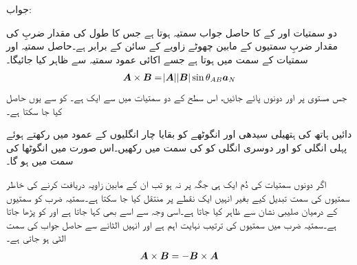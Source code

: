 جواب:

دو سمتیات  اور  کے  کا حاصل جواب سمتیہ ہوتا ہے جس کا طول  کی مقدار ضربِ   کی مقدار ضربِ سمتیوں کے مابین چھوٹے زاویے کے سائن کے برابر ہے۔حاصل سمتیہ  اور  سمتیات  کے    سمت  میں ہوتا ہے جسے اکائی عمود سمتیہ  سے ظاہر کیا جائیگا۔
\begin{align}\label{مساوات_سمتیہ_سمتی_ضرب}
{\ensuremath{{\boldsymbol{A}}}} \times {\ensuremath{{\boldsymbol{B}}}}=\abs{{{\boldsymbol{A}}}} \abs{{{\boldsymbol{B}}}} \sin \theta_{AB} {{\boldsymbol{a}}}_N
\end{align}
جس مستوی پر  اور  دونوں پائے جائیں،  اس سطح کے   دو سمتیات میں سے ایک ہے۔ کو  سے یوں حاصل کیا جا سکتا ہے۔

دائیں ہاتھ کی ہتھیلی  سیدھی اور انگوٹھے کو بقایا چار انگلیوں کے عمود میں رکھتے ہوئے پہلی انگلی کو  اور  دوسری انگلی کو  کی سمت میں رکھیں۔اس صورت میں انگوٹھا  کی سمت میں ہو گا۔  

اگر دونوں سمتیات کی دُم ایک ہی جگہ پر نہ ہو تب ان کے مابین زاویہ دریافت کرنے کی  خاطر سمتیوں کی سمت تبدیل کیے بغیر انہیں ایک نقطے پر منتقل کیا جا سکتا ہے۔سمتیہ ضرب کو سمتیوں کے درمیان صلیبی نشان  سے ظاہر کیا جاتا ہے۔اسی وجہ سے اسے  بھی کہا جاتا ہے اور  کو  پڑھا جاتا ہے۔سمتیہ ضرب میں سمتیوں کی ترتیب نہایت اہم ہے اور انہیں الٹانے سے حاصل جواب کی سمت الٹی ہو جاتی ہے۔
\begin{align}\label{مساوات_سمتیہ_صلیبی_ضرب_ترتیب_الٹاتے_منفی_سمت}
{\ensuremath{{\boldsymbol{A}}}} \times {\ensuremath{{\boldsymbol{B}}}}=- {{\boldsymbol{B}}} \times {\ensuremath{{\boldsymbol{A}}}}
\end{align}

